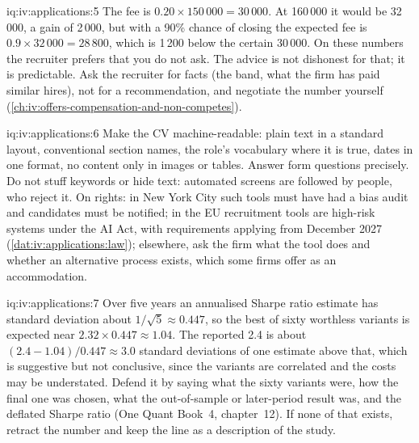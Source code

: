 \begin{solution}{iq:iv:applications:5}
The fee is $0.20 \times 150\,000 = 30\,000$. At 160\,000 it would be 32\,000, a gain of 2\,000, but with a
90\% chance of closing the expected fee is $0.9 \times 32\,000 = 28\,800$, which is 1\,200 below the certain
30\,000. On these numbers the recruiter prefers that you do not ask. The advice is not dishonest for that; it
is predictable. Ask the recruiter for facts (the band, what the firm has paid similar hires), not for a
recommendation, and negotiate the number yourself (\cref{ch:iv:offers-compensation-and-non-competes}).
\end{solution}

\begin{solution}{iq:iv:applications:6}
Make the CV machine-readable: plain text in a standard layout, conventional section names, the role's
vocabulary where it is true, dates in one format, no content only in images or tables. Answer form questions
precisely. Do not stuff keywords or hide text: automated screens are followed by people, who reject it. On
rights: in New York City such tools must have had a bias audit and candidates must be notified; in the EU
recruitment tools are high-risk systems under the AI Act, with requirements applying from December 2027
(\cref{dat:iv:applications:law}); elsewhere, ask the firm what the tool does and whether an alternative
process exists, which some firms offer as an accommodation.
\end{solution}

\begin{solution}{iq:iv:applications:7}
Over five years an annualised Sharpe ratio estimate has standard deviation about $1/\sqrt5 \approx 0.447$, so
the best of sixty worthless variants is expected near $2.32 \times 0.447 \approx 1.04$. The reported 2.4 is
about $(2.4 - 1.04)/0.447 \approx 3.0$ standard deviations of one estimate above that, which is suggestive but
not conclusive, since the variants are correlated and the costs may be understated. Defend it by saying what
the sixty variants were, how the final one was chosen, what the out-of-sample or later-period result was, and
the deflated Sharpe ratio (One Quant Book~4, chapter~12). If none of that exists, retract the number and keep
the line as a description of the study.
\end{solution}

